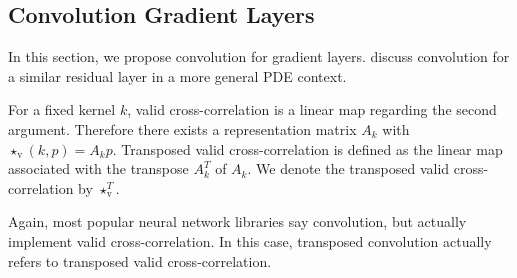 \documentclass[twoside,a4paper]{article}
\begin{document}
\subsection{Convolution Gradient Layers}\label{sec_conv_gradient_layer}

In this section, we propose convolution for gradient layers.
\citet{Ruthotto2020} discuss convolution for a similar residual layer in a more 
general PDE context.

For a fixed kernel $k$, valid cross-correlation is a linear map regarding the second argument. 
Therefore there exists a representation matrix $A_{k}$ with 
$\star_{\text{v}}(k,p) = A_{k}p$. Transposed valid cross-correlation 
is defined as the linear map associated with the transpose $A_{k}^T$ of $A_{k}$.
We denote the transposed valid cross-correlation by $\star_{\text{v}}^T$.

Again, most popular neural network libraries say convolution, but actually implement
valid cross-correlation. In this case, transposed convolution actually refers to
transposed valid cross-correlation.
\end{document}
